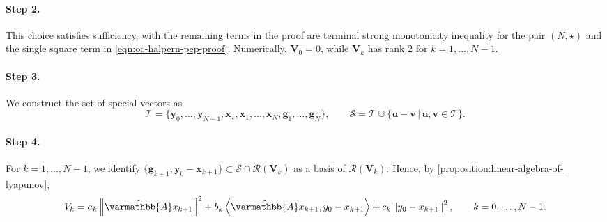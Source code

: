 \documentclass{article}
\theoremstyle{definition}
\theoremstyle{plain}
\newcommand{\vg}{{\mathbf{g}}}
\newcommand{\vu}{{\mathbf{u}}}
\newcommand{\vv}{{\mathbf{v}}}
\newcommand{\vx}{{\mathbf{x}}}
\newcommand{\vy}{{\mathbf{y}}}
\newcommand{\vV}{{\mathbf{V}}}
\newcommand{\cR}{{\mathcal{R}}}
\newcommand{\cS}{{\mathcal{S}}}
\newcommand{\cT}{{\mathcal{T}}}
\newcommand{\opA}{{\varmathbb{A}}}
\newcommand{\inprod}[2]{\left\langle #1,#2 \right\rangle}
\newcommand{\sqnorm}[1]{\left\| #1 \right\|^2}
\newcommand{\topa}{\tilde{\opA}}
\begin{document}
\paragraph{Step 2.}
This choice satisfies sufficiency, with the remaining terms in the proof are terminal strong monotonicity inequality for the pair $(N,\star)$ and the single square term in \eqref{eqn:oc-halpern-pep-proof}.
Numerically, $\vV_0=0$, while $\vV_k$ has rank $2$ for $k=1,\dots,N-1$.

\paragraph{Step 3.}
We construct the set of special vectors as
\[
    \cT=\{\vy_0,\dots,\vy_{N-1},\vx_\star,\vx_1,\dots,\vx_N,\vg_1,\dots,\vg_N\},
    \qquad
    \cS=\cT\cup\{\vu-\vv \,|\, \vu,\vv\in\cT\}. 
\]

\paragraph{Step 4.}
For $k=1,\dots,N-1$, we identify $\{\vg_{k+1},\vy_0-\vx_{k+1}\}\subset \cS\cap\cR(\vV_k)$ as a basis of $\cR(\vV_k)$.
Hence, by \cref{proposition:linear-algebra-of-lyapunov},
\[
    V_k
    =
    a_k\sqnorm{\topa x_{k+1}}
    +b_k\inprod{\topa x_{k+1}}{y_0-x_{k+1}}
    +c_k\sqnorm{y_0-x_{k+1}},
    \qquad k=0,\dots,N-1.
\]
\end{document}
